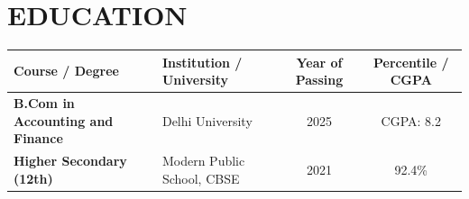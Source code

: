 \documentclass[9.5pt,a4paper]{extarticle}
\begin{document}
\section*{EDUCATION}
{\small
\renewcommand{\arraystretch}{1.2}
\noindent\begin{tabularx}{\textwidth}{|p{1.6in}|X|c|c|}
\hline
\textbf{Course / Degree} & \textbf{Institution / University} & \textbf{Year of Passing} & \textbf{Percentile / CGPA} \\ \hline
\textbf{B.Com in Accounting and Finance} & Delhi University & 2025 & CGPA: 8.2 \\ \hline
\textbf{Higher Secondary (12th)} & Modern Public School, CBSE & 2021 & 92.4\% \\ \hline
\end{tabularx}
}
\end{document}
